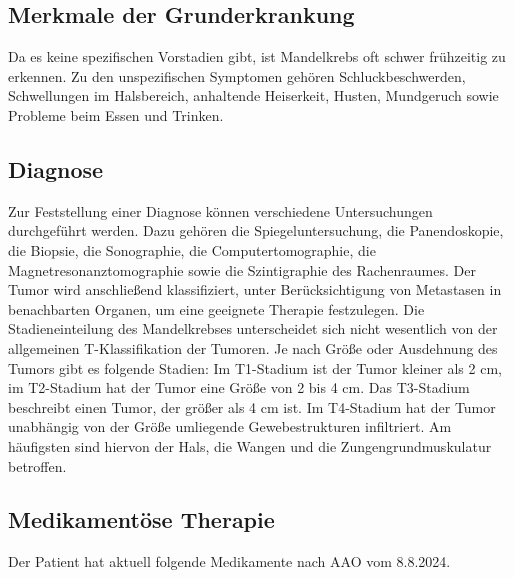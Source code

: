 \documentclass[a4paper,12pt]{article}
\begin{document}
\subsection{Merkmale der Grunderkrankung}
Da es keine spezifischen Vorstadien gibt, ist Mandelkrebs oft schwer frühzeitig
zu erkennen. Zu den unspezifischen Symptomen gehören Schluckbeschwerden,
Schwellungen im Halsbereich, anhaltende Heiserkeit, Husten, Mundgeruch sowie
Probleme beim Essen und Trinken.

\subsection{Diagnose}
Zur Feststellung einer Diagnose können verschiedene Untersuchungen durchgeführt
werden. Dazu gehören die Spiegeluntersuchung, die Panendoskopie, die Biopsie,
die Sonographie, die Computertomographie, die Magnetresonanztomographie sowie
die Szintigraphie des Rachenraumes. Der Tumor wird anschließend klassifiziert,
unter Berücksichtigung von Metastasen in benachbarten Organen, um eine geeignete
Therapie festzulegen. Die Stadieneinteilung des Mandelkrebses unterscheidet sich
nicht wesentlich von der allgemeinen T-Klassifikation der Tumoren. Je nach Größe
oder Ausdehnung des Tumors gibt es folgende Stadien: Im T1-Stadium ist der Tumor
kleiner als 2 cm, im T2-Stadium hat der Tumor eine Größe von 2 bis 4 cm. Das T3-Stadium
beschreibt einen Tumor, der größer als 4 cm ist. Im T4-Stadium hat der Tumor
unabhängig von der Größe umliegende Gewebestrukturen infiltriert. Am häufigsten
sind hiervon der Hals, die Wangen und die Zungengrundmuskulatur betroffen.

\subsection{Medikamentöse Therapie}

Der Patient hat aktuell folgende Medikamente nach AAO vom 8.8.2024.
\end{document}
